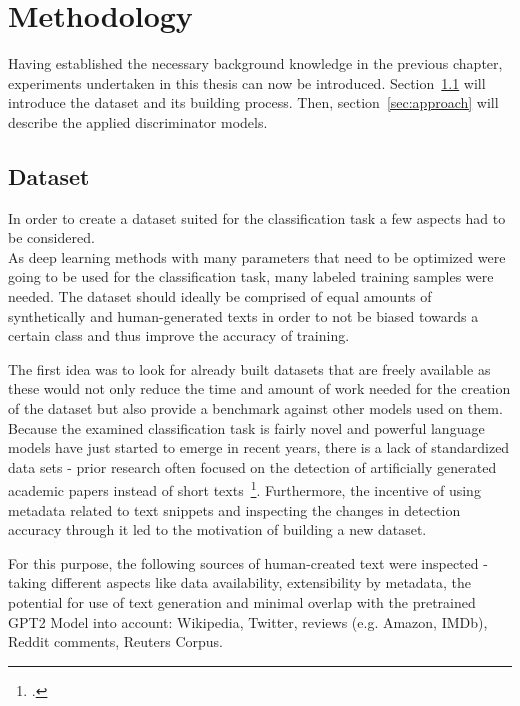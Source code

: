 \section{Methodology}
\label{ch:methodology}

Having established the necessary background knowledge in the previous chapter, experiments undertaken in this thesis can  now be introduced. Section~\ref{sec:dataset} will introduce the dataset and its building process. Then, section~\ref{sec:approach} will describe the applied discriminator models.

\subsection{Dataset}
\label{sec:dataset}

In order to create a dataset suited for the classification task a few aspects had to be considered. \\
As deep learning methods with many parameters that need to be optimized were going to be used for the classification task, many labeled training samples were needed. The dataset should ideally be comprised of equal amounts of synthetically and human-generated texts in order to not be biased towards a certain class and thus improve the accuracy of training.

The first idea was to look for already built datasets that are freely available as these would not only reduce the time and amount of work needed for the creation of the dataset but also provide a benchmark against other models used on them. Because the examined classification task is fairly novel and powerful language models have just started to emerge in recent years, there is a lack of standardized data sets - prior research often focused on the detection of artificially generated academic papers instead of short texts~\footcite{lavoie2010algorithmic}. Furthermore, the incentive of using metadata related to text snippets and inspecting the changes in detection accuracy through it led to the motivation of building a new dataset.

For this purpose, the following sources of human-created text were inspected - taking different aspects like data availability, extensibility by metadata, the potential for use of text generation and minimal overlap with the pretrained GPT2 Model into account: Wikipedia, Twitter, reviews (e.g. Amazon, IMDb), Reddit comments, Reuters Corpus.


